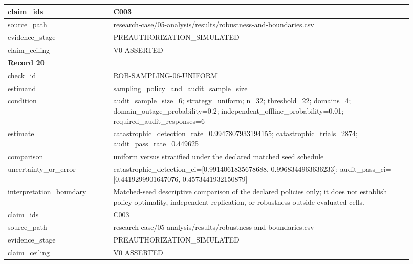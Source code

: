 \begin{longtable}{|p{0.24\linewidth}|p{0.68\linewidth}|}
claim\_\allowbreak{}ids & C003 \\ \hline
source\_\allowbreak{}path & research-case/05-analysis/results/robustness-and-boundaries.csv \\ \hline
evidence\_\allowbreak{}stage & PREAUTHORIZATION\_\allowbreak{}SIMULATED \\ \hline
claim\_\allowbreak{}ceiling & V0 ASSERTED \\ \hline
\multicolumn{2}{|l|}{\textbf{Record 20}} \\ \hline
check\_\allowbreak{}id & ROB-SAMPLING-06-UNIFORM \\ \hline
estimand & sampling\_\allowbreak{}policy\_\allowbreak{}and\_\allowbreak{}audit\_\allowbreak{}sample\_\allowbreak{}size \\ \hline
condition & audit\_\allowbreak{}sample\_\allowbreak{}size=6;\allowbreak{} strategy=uniform;\allowbreak{} n=32;\allowbreak{} threshold=22;\allowbreak{} domains=4;\allowbreak{} domain\_\allowbreak{}outage\_\allowbreak{}probability=0.2;\allowbreak{} independent\_\allowbreak{}offline\_\allowbreak{}probability=0.01;\allowbreak{} required\_\allowbreak{}audit\_\allowbreak{}responses=6 \\ \hline
estimate & catastrophic\_\allowbreak{}detection\_\allowbreak{}rate=0.9947807933194155;\allowbreak{} catastrophic\_\allowbreak{}trials=2874;\allowbreak{} audit\_\allowbreak{}pass\_\allowbreak{}rate=0.449625 \\ \hline
comparison & uniform versus stratified under the declared matched seed schedule \\ \hline
uncertainty\_\allowbreak{}or\_\allowbreak{}error & catastrophic\_\allowbreak{}detection\_\allowbreak{}ci=[0.9914061835678688, 0.9968344963636233];\allowbreak{} audit\_\allowbreak{}pass\_\allowbreak{}ci=[0.4419299901647076, 0.4573441932150879] \\ \hline
interpretation\_\allowbreak{}boundary & Matched-seed descriptive comparison of the declared policies only;\allowbreak{} it does not establish policy optimality, independent replication, or robustness outside evaluated cells. \\ \hline
claim\_\allowbreak{}ids & C003 \\ \hline
source\_\allowbreak{}path & research-case/05-analysis/results/robustness-and-boundaries.csv \\ \hline
evidence\_\allowbreak{}stage & PREAUTHORIZATION\_\allowbreak{}SIMULATED \\ \hline
claim\_\allowbreak{}ceiling & V0 ASSERTED \\ \hline

\end{longtable}
